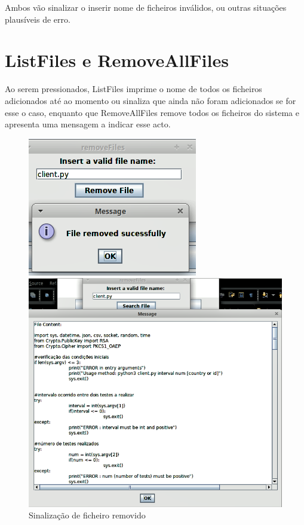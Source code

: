 \documentclass{report}
\begin{document}
Ambos vão sinalizar o inserir nome de ficheiros inválidos, ou outras situações plausíveis de erro. 

\section{ListFiles e RemoveAllFiles}

Ao serem pressionados, ListFiles imprime o nome de todos os ficheiros adicionados até ao momento ou sinaliza que ainda não foram adicionados se for esse o caso, enquanto que RemoveAllFiles remove todos os ficheiros do sistema e apresenta uma mensagem a indicar esse acto. 

\begin{figure}[!tbp]
  \centering
  \begin{minipage}[b]{0.4\textwidth}
    \includegraphics[width=\textwidth]{rmvFiles.png}
    \caption{Sinalização de ficheiro removido}
  \end{minipage}
  \hfill
  \begin{minipage}[b]{0.49\textwidth}
    \includegraphics[width=\textwidth]{srchFile.png}

\end{minipage}
\end{figure}
\end{document}
